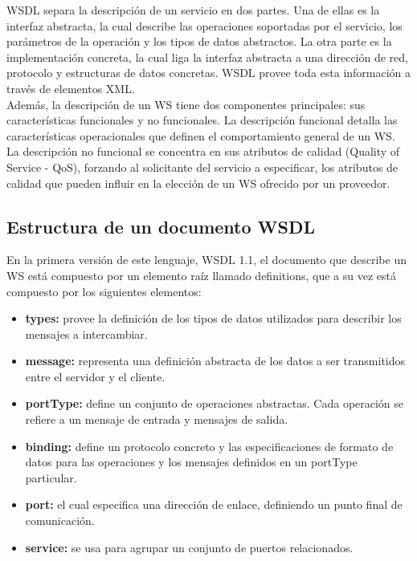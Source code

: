 WSDL separa la descripción de un servicio en dos partes. Una de ellas es la interfaz abstracta, la cual describe las operaciones soportadas por el servicio, los parámetros de la operación y los tipos de datos abstractos. La otra parte es la implementación concreta, la cual liga la interfaz abstracta a una dirección de red, protocolo y estructuras de datos concretas. WSDL provee toda esta información a través de elementos XML. \\
Además, la descripción de un WS tiene dos componentes principales: sus características funcionales y no funcionales. La descripción funcional detalla las características operacionales que definen el comportamiento general de un WS. La descripción no funcional se concentra en sus atributos de calidad (Quality of Service - QoS), forzando al solicitante del servicio a especificar, los atributos de calidad que pueden influir en la elección de un WS ofrecido por un proveedor.

\subsection{Estructura de un documento WSDL}

En la primera versión de este lenguaje, WSDL 1.1, el documento que describe un WS está compuesto por un elemento raíz llamado definitions, que a su vez está compuesto por los siguientes elementos:

\begin{itemize}
	\item \textbf{types:} provee la definición de los tipos de datos utilizados para describir los mensajes a intercambiar.
	\item \textbf{message:} representa una definición abstracta de los datos a ser transmitidos entre el servidor y el cliente.
	\item \textbf{portType:} define un conjunto de operaciones abstractas. Cada operación se refiere a un mensaje de entrada y mensajes de salida.
	\item \textbf{binding:} define un protocolo concreto y las especificaciones de formato de datos para las operaciones y los mensajes definidos en un portType particular.
	\item \textbf{port:} el cual especifica una dirección de enlace, definiendo un punto final de comunicación.
	\item \textbf{service:} se usa para agrupar un conjunto de puertos relacionados.
\end{itemize}

